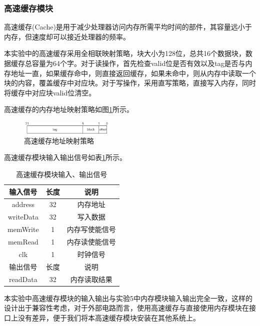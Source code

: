 \documentclass[UTF8]{ctexart}
\begin{document}
\subsubsection{高速缓存模块}
    高速缓存(Cache)是用于减少处理器访问内存所需平均时间的部件，其容量远小于内存，但速度却可以接近处理器的频率。\par
    本实验中的高速缓存采用全相联映射策略，块大小为128位，总共16个数据块，数据缓存总容量为64个字。对于读操作，首先检查valid位是否有效以及tag是否与内存地址一直，如果缓存命中，则直接返回缓存，如果未命中，则从内存中读取一个块的内容，覆盖缓存中对应块。对于写操作，采用直写策略，直接写入内存，同时将缓存中对应块valid位清空。\par
    高速缓存的内存地址映射策略如图\ref{fig:cache-addr}所示。
    \begin{figure}[H]
        \centering
        \includegraphics[width=0.4\textwidth]{fig-cache-addr.png}
        \caption{高速缓存地址映射策略}
        \label{fig:cache-addr}
    \end{figure}
    高速缓存模块输入输出信号如表\ref{tab:cache-input-output-sig}所示。
    \begin{table}[htbp]
        \centering
        \begin{tabular}{|c|c|c|}
        \hline
        输入信号 & 长度 & 说明 \\ \hline
        address & 32 & 内存地址 \\
        writeData & 32 & 写入数据 \\
        memWrite & 1 & 内存写使能信号 \\
        memRead & 1 & 内存读使能信号 \\
        clk & 1 & 时钟信号 \\
        \hline
        \hline
        输出信号 & 长度 & 说明 \\ 
        \hline
        readData & 32 & 内存读取结果\\
        \hline
        \end{tabular}
        \caption{高速缓存模块输入、输出信号}
        \label{tab:cache-input-output-sig}
        \end{table}\par
    本实验中高速缓存模块的输入输出与实验5中内存模块输入输出完全一致，这样的设计出于兼容性考虑，对于外部电路而言，使用高速缓存与直接使用内存模块在接口上没有差异，便于我们将本高速缓存模块安装在其他系统上。
\end{document}
